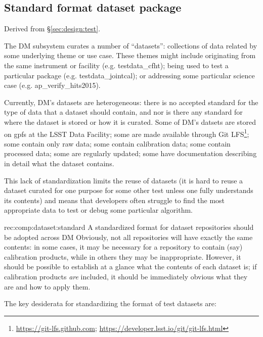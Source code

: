 \subsection{Standard format dataset package}
\label{sec:comp:dataset}

Derived from \S\ref{sec:design:test}.

The DM subsystem curates a number of ``datasets'': collections of data related by some underlying theme or use case.
These themes might include originating from the same instrument or facility (e.g. testdata\_cfht); being used to test a particular package (e.g. testdata\_jointcal); or addressing some particular science case (e.g. ap\_verify\_hits2015).

Currently, DM's datasets are heterogeneous: there is no accepted standard for the type of data that a dataset should contain, and nor is there any standard for where the dataset is stored or how it is curated.
Some of DM's datsets are stored on \gls{gpfs} at the LSST Data Facility; some are made available through Git LFS\footnote{\url{https://git-lfs.github.com}; \url{https://developer.lsst.io/git/git-lfs.html}}; some contain only raw data; some contain calibration data; some contain processed data; some are regularly updated; some have documentation describing in detail what the dataset contains.

This lack of standardization limits the reuse of datasets (it is hard to reuse a dataset curated for one purpose for some other test unless one fully understands its contents) and means that developers often struggle to find the most appropriate data to test or debug some particular algorithm.

\begin{recommendation}
    {rec:comp:dataset:standard}
    {A standardized format for dataset repositories should be adopted across DM}
Obviously, not all repositories will have exactly the same contents: in some cases, it may be necessary for a repository to contain (say) calibration products, while in others they may be inappropriate.
However, it should be possible to establish at a glance what the contents of each dataset is; if calibration products \emph{are} included, it should be immediately obvious what they are and how to apply them.
\end{recommendation}

The key desiderata for standardizing the format of test datasets are:

